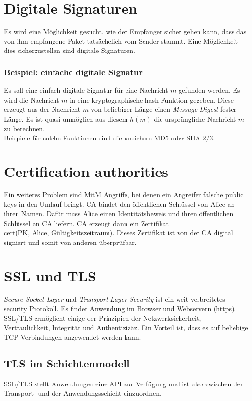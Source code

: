 \section{Digitale Signaturen}
Es wird eine Möglichkeit gesucht, wie der Empfänger sicher gehen kann, dass das von ihm empfangene Paket tatsächelich vom Sender stammt. Eine Möglichkeit dies sicherzustellen sind digitale Signaturen.

\subsubsection{Beispiel: einfache digitale Signatur}
Es soll eine einfach digitale Signatur für eine Nachricht $m$ gefunden werden. Es wird die Nachricht $m$ in eine kryptographische hash-Funktion gegeben. Diese erzeugt aus der Nachricht $m$ von beliebiger Länge einen \emph{Message Digest} fester Länge. Es ist quasi unmöglich aus diesem $h(m)$ die ursprüngliche Nachricht $m$ zu berechnen.\\
Beispiele für solche Funktionen sind die unsichere MD5 oder SHA-2/3.

\section{Certification authorities}
Ein weiteres Problem sind MitM Angriffe, bei denen ein Angreifer falsche public keys in den Umlauf bringt. CA bindet den öffentlichen Schlüssel von Alice an ihren Namen. Dafür muss Alice einen Identitätsbeweis und ihren öffentlichen Schlüssel an CA liefern. CA erzeugt dann ein Zertifikat\\ cert(PK, Alice, Gültigkeitszeitraum). Dieses Zertifikat ist von der CA digital signiert und somit von anderen überprüfbar.

\section{SSL und TLS}
\emph{Secure Socket Layer} und \emph{Transport Layer Security} ist ein weit verbreitetes security Protokoll. Es findet Anwendung im Browser und Webservern (https). SSL/TLS ermöglicht einige der Prinzipien der Netzwerksicherheit, Vertraulichkeit, Integrität und Authentizizäz.
Ein Vorteil ist, dass es auf beliebige TCP Verbindungen angewendet werden kann.

\subsection{TLS im Schichtenmodell}
SSL/TLS stellt Anwendungen eine API zur Verfügung und ist also zwischen der Transport- und der Anwendungsschicht einzuordnen.

